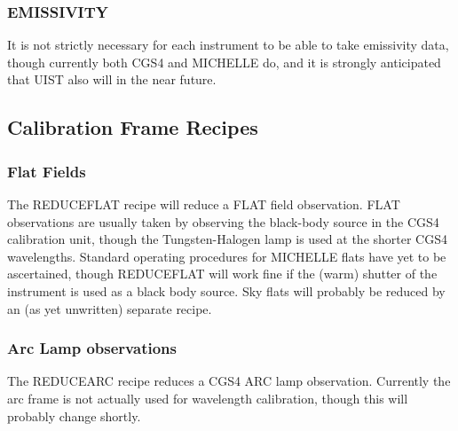 \documentclass[twoside,11pt]{article}
\renewcommand{\_}{\texttt{\symbol{95}}}
\begin{document}




\subsubsection{EMISSIVITY}

It is not strictly necessary for each instrument to be able to take
emissivity data, though currently both CGS4 and MICHELLE do, and it is
strongly anticipated that UIST also will in the near future.



\subsection{Calibration Frame Recipes}

\subsubsection{Flat Fields}

The REDUCE\_FLAT recipe will reduce a FLAT field observation. FLAT
observations are usually taken by observing the black-body source in
the CGS4 calibration unit, though the Tungsten-Halogen lamp is used at
the shorter CGS4 wavelengths. Standard operating procedures for
MICHELLE flats have yet to be ascertained, though REDUCE\_FLAT will
work fine if the (warm) shutter of the instrument is used as a black
body source. Sky flats will probably be reduced by an (as yet
unwritten) separate recipe.



\subsubsection{Arc Lamp observations}

The REDUCE\_ARC recipe reduces a CGS4 ARC lamp observation. Currently
the arc frame is not actually used for wavelength calibration, though
this will probably change shortly.

\end{document}
